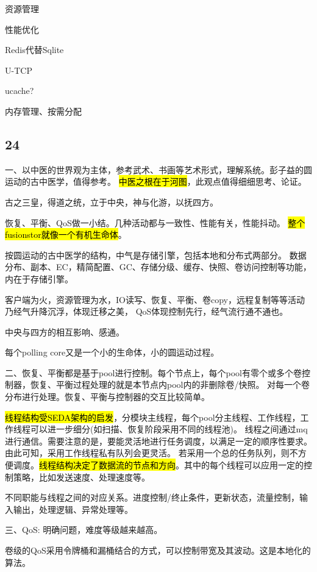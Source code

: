 资源管理

性能优化
\begin{enumbox}
\item Redis代替Sqlite
\item U-TCP
\item ucache?
\item 内存管理、按需分配
\end{enumbox}

\subsection{24}

一、以中医的世界观为主体，参考武术、书画等艺术形式，理解系统。彭子益的圆运动的古中医学，值得参考。
\hl{中医之根在于河图}，此观点值得细细思考、论证。

古之三皇，得道之统，立于中央，神与化游，以抚四方。

恢复、平衡、QoS做一小结。几种活动都与一致性、性能有关，性能抖动。
\hl{整个fusionstor就像一个有机生命体}。

按圆运动的古中医学的结构，中气是存储引擎，包括本地和分布式两部分。
数据分布、副本、EC，精简配置、GC、存储分级、缓存、快照、卷访问控制等功能，内在于存储引擎。

客户端为火，资源管理为水，IO读写、恢复、平衡、卷copy，远程复制等等活动乃经气升降沉浮，体现迁移之美，
QoS体现控制先行，经气流行通不通也。

中央与四方的相互影响、感通。

每个polling core又是一个小的生命体，小的圆运动过程。

二、恢复、平衡都是基于pool进行控制。每个节点上，每个pool有零个或多个卷控制器，恢复、平衡过程处理的就是本节点内pool内的非删除卷/快照。
对每一个卷分布进行处理。恢复、平衡与控制器的交互比较简单。

\hl{线程结构受SEDA架构的启发}，分模块主线程，每个pool分主线程、工作线程，工作线程可以进一步细分(如扫描、恢复阶段采用不同的线程池)。
线程之间通过mq进行通信。需要注意的是，要能灵活地进行任务调度，以满足一定的顺序性要求。由此可知，采用工作线程私有队列会更灵活。
若采用一个总的任务队列，则不方便调度。\hl{线程结构决定了数据流的节点和方向}。其中的每个线程可以应用一定的控制策略，比如发送速度、处理速度等。

不同职能与线程之间的对应关系。进度控制/终止条件，更新状态，流量控制，输入输出，处理逻辑、异常处理等。

三、QoS: 明确问题，难度等级越来越高。

卷级的QoS采用令牌桶和漏桶结合的方式，可以控制带宽及其波动。这是本地化的算法。

